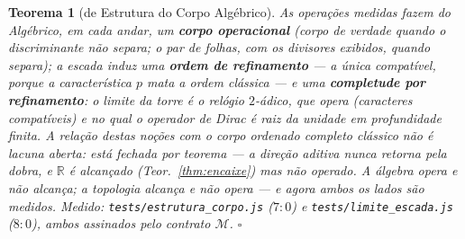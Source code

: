 \documentclass[11pt,a4paper]{article}
\newtheorem{teorema}{Teorema}
\newcommand{\code}[1]{\texttt{\small #1}}
\begin{document}
\begin{teorema}[de Estrutura do Corpo Algébrico]\label{thm:estrutura}
As operações medidas fazem do Algébrico, em cada andar, um
\textbf{corpo operacional} (corpo de verdade quando o discriminante
não separa; o par de folhas, com os divisores exibidos, quando
separa); a escada induz uma \textbf{ordem de refinamento} --- a única
compatível, porque a característica $p$ mata a ordem clássica --- e
uma \textbf{completude por refinamento}: o limite da torre é o relógio
$2$-ádico, que \emph{opera} (caracteres compatíveis) e no qual o
operador de Dirac é raiz da unidade em profundidade finita. A relação
destas noções com o corpo ordenado completo clássico não é lacuna
aberta: está \emph{fechada por teorema} --- a direção aditiva nunca
retorna pela dobra, e $\mathbb{R}$ é alcançado (Teor.~\ref{thm:encaixe})
mas não operado. \emph{A álgebra opera e não alcança; a topologia
alcança e não opera} --- e agora ambos os lados são medidos.
\emph{Medido:} \code{tests/estrutura\_corpo.js} ($7{:}0$) e
\code{tests/limite\_escada.js} ($8{:}0$), ambos assinados pelo
contrato $\mathcal{M}$.
$\square$
\end{teorema}
\end{document}
